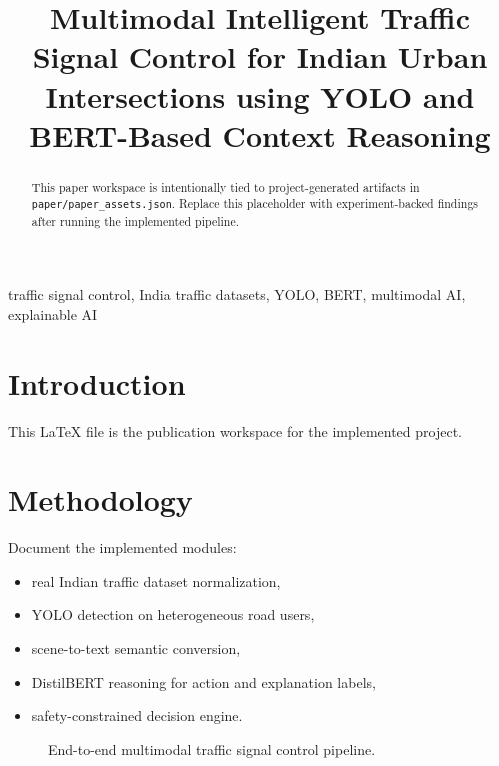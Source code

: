 \documentclass[conference]{IEEEtran}
\begin{document}
\title{Multimodal Intelligent Traffic Signal Control for Indian Urban Intersections using YOLO and BERT-Based Context Reasoning}

\author{
}

\maketitle

\begin{abstract}
This paper workspace is intentionally tied to project-generated artifacts in \texttt{paper/paper\_assets.json}. Replace this placeholder with experiment-backed findings after running the implemented pipeline.
\end{abstract}

\begin{IEEEkeywords}
traffic signal control, India traffic datasets, YOLO, BERT, multimodal AI, explainable AI
\end{IEEEkeywords}

\section{Introduction}
This LaTeX file is the publication workspace for the implemented project.

\section{Methodology}
Document the implemented modules:
\begin{itemize}
\item real Indian traffic dataset normalization,
\item YOLO detection on heterogeneous road users,
\item scene-to-text semantic conversion,
\item DistilBERT reasoning for action and explanation labels,
\item safety-constrained decision engine.
\end{itemize}

\begin{figure}[!t]
\centering
{}
\caption{End-to-end multimodal traffic signal control pipeline.}
\label{fig:architecture}
\end{figure}
\end{document}

